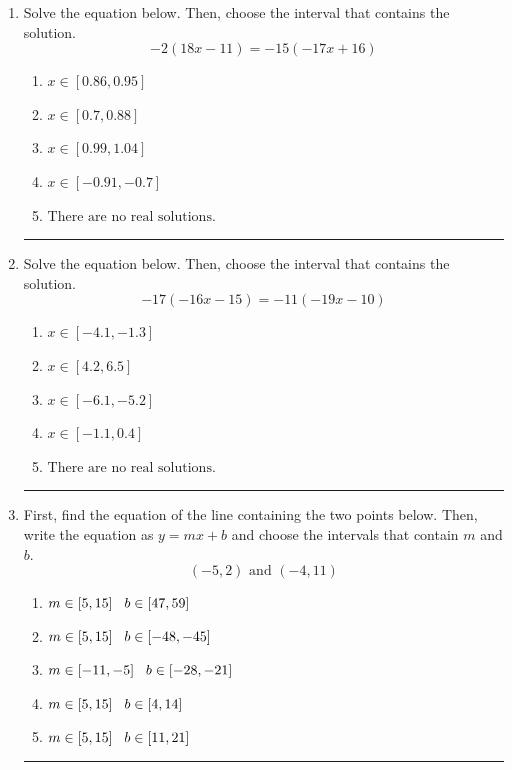 \documentclass[14pt]{extbook}
\newcommand{\litem}[1]{\item#1\hspace*{-1cm}\rule{\textwidth}{0.4pt}}
\begin{document}
\begin{enumerate}
{\begin{enumerate}[label=\Alph*.]
\end{enumerate} }
\litem{
Solve the equation below. Then, choose the interval that contains the solution.\[ -2(18x -11) = -15(-17x + 16) \]\begin{enumerate}[label=\Alph*.]
\item \( x \in [0.86, 0.95] \)
\item \( x \in [0.7, 0.88] \)
\item \( x \in [0.99, 1.04] \)
\item \( x \in [-0.91, -0.7] \)
\item \( \text{There are no real solutions.} \)

\end{enumerate} }
\litem{
Solve the equation below. Then, choose the interval that contains the solution.\[ -17(-16x -15) = -11(-19x -10) \]\begin{enumerate}[label=\Alph*.]
\item \( x \in [-4.1, -1.3] \)
\item \( x \in [4.2, 6.5] \)
\item \( x \in [-6.1, -5.2] \)
\item \( x \in [-1.1, 0.4] \)
\item \( \text{There are no real solutions.} \)

\end{enumerate} }
\litem{
First, find the equation of the line containing the two points below. Then, write the equation as $ y=mx+b $ and choose the intervals that contain $m$ and $b$.\[ (-5, 2) \text{ and } (-4, 11) \]\begin{enumerate}[label=\Alph*.]
\item \( m \in [5, 15] \hspace*{3mm} b \in [47, 59] \)
\item \( m \in [5, 15] \hspace*{3mm} b \in [-48, -45] \)
\item \( m \in [-11, -5] \hspace*{3mm} b \in [-28, -21] \)
\item \( m \in [5, 15] \hspace*{3mm} b \in [4, 14] \)
\item \( m \in [5, 15] \hspace*{3mm} b \in [11, 21] \)


\end{enumerate}}
\end{enumerate}
\end{document}

